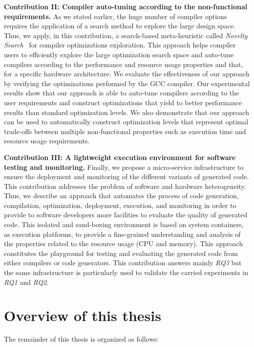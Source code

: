 \textbf{Contribution II: Compiler auto-tuning according to the non-functional requirements.}
As we stated earlier, the huge number of compiler options requires the application of a search method to explore the large design space. Thus, we apply, in this contribution, a search-based meta-heuristic called \textit{Novelty Search}~\cite{lehman2008exploiting} for compiler optimizations exploration. This approach helps compiler users to efficiently explore the large optimization search space and auto-tune compilers according to the performance and resource usage properties and that, for a specific hardware architecture. 
We evaluate the effectiveness of our approach by verifying the optimizations performed by the GCC compiler.
Our experimental results show that our approach is able to auto-tune compilers according to the user requirements and construct optimizations that yield to better performance results than standard optimization levels. We also demonstrate that our approach can be used to automatically construct optimization levels that represent optimal trade-offs between multiple non-functional properties such as execution time and resource usage requirements.

\textbf{Contribution III: A lightweight execution environment for software testing and monitoring.}
Finally, we propose a micro-service infrastructure to ensure the deployment and monitoring of the different variants of generated code. This contribution addresses the problem of software and hardware heterogeneity. Thus, we describe an approach that automates the process of code generation, compilation, optimization, deployment, execution, and monitoring in order to provide to software developers more facilities to evaluate the quality of generated code. 
This isolated and sand-boxing environment is based on system containers, as execution platforms, to provide a fine-grained understanding and analysis of the properties related to the resource usage (CPU and memory). 
This approach constitutes the playground for testing and evaluating the generated code from either compilers or code generators. This contribution answers mainly \textit{RQ3} but the same infrastructure is particularly used to validate the carried experiments in \textit{RQ1} and \textit{RQ2}.

\section{Overview of this thesis}
The remainder of this thesis is organized  as follows:


